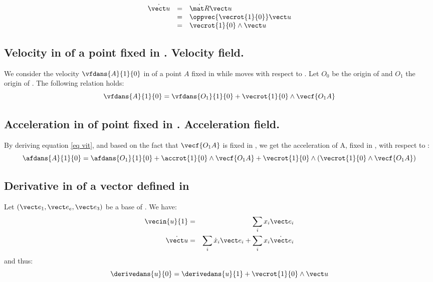 \begin{equation}\label{vrot}
\begin{array}{rcl}
 \dot{\vect u} &=& \dot{\mat R} \vect u \\
               &=& \oppvec{ \vecrot{1}{0} } \vect u \\
               &=& \vecrot{1}{0} \wedge \vect u
\end{array}
\end{equation}
 

\subsection{Velocity in  of a point fixed in . Velocity field.}
We consider the velocity $\vfdans{A}{1}{0}$ in  of a point $A$ fixed in  while  moves with respect to . Let $O_0$ be the origin of  and $O_1$ the origin of . The following relation holds:
$$ \vfdans{A}{1}{0} = \vfdans{O_1}{1}{0} + \vecrot{1}{0} \wedge \vecf{O_1A} \label{eq vit} \label{eq vit solide}
$$

\subsection{Acceleration in  of  point fixed in . Acceleration field. }
By deriving equation \ref{eq vit}, and based on the fact that $\vecf{O_1A}$ is fixed in , we get the acceleration of A, fixed in , with respect to :
\begin{equation}\label{eq acc}
 \afdans{A}{1}{0} = \afdans{O_1}{1}{0} + \accrot{1}{0}\wedge \vecf{O_1A} + \vecrot{1}{0} \wedge \left( \vecrot{1}{0} \wedge \vecf{O_1A} \right)
\end{equation}

\subsection{Derivative in  of a vector defined in }
Let $(\vect e_1, \vect e_e, \vect e_3)$ be a base of . We have:
\begin{eqnarray*}
 \vecin{u}{1} &=& \sum_i x_i \vect e_i\\
 \dot{\vect u} &=& \sum_i \dot x_i \vect e_i + \sum_i x_i \dot{\vect e}_i
\end{eqnarray*}
and thus:
\begin{equation}\label{eq vec mob}
 \derivedans{u}{0} = \derivedans{u}{1} + \vecrot{1}{0} \wedge \vect u
\end{equation}


